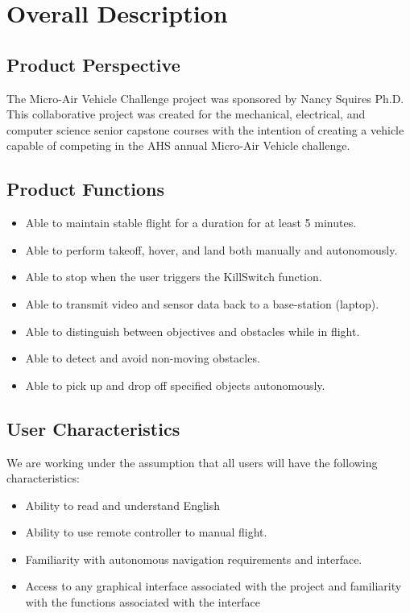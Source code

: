 \documentclass[onecolumn, draftclsnofoot,10pt, compsoc]{IEEEtran}
\begin{document}
\section{Overall Description}

\subsection{Product Perspective}
\indent The Micro-Air Vehicle Challenge project was sponsored by Nancy Squires Ph.D. This collaborative project was created for the mechanical, electrical, and computer science senior capstone courses with the intention of creating a vehicle capable of competing in the AHS annual Micro-Air Vehicle challenge. 

\subsection{Product Functions}
\begin{itemize} 

\item Able to maintain stable flight for a duration for at least 5 minutes.

\item Able to perform takeoff, hover, and land both manually and autonomously.

\item Able to stop when the user triggers the KillSwitch function.
 
\item Able to transmit video and sensor data back to a base-station (laptop).
 
\item Able to distinguish between objectives and obstacles while in flight. 

\item Able to detect and avoid non-moving obstacles.

\item Able to pick up and drop off specified objects autonomously.
\end{itemize}



\subsection{User Characteristics}

We are working under the assumption that all users will have the following characteristics:
\begin{itemize}
    \item Ability to read and understand English
    \item Ability to use remote controller to manual flight. 
    \item Familiarity with autonomous navigation requirements and interface.
    \item Access to any graphical interface associated with the project and familiarity with the functions associated with the interface
\end{itemize}
\end{document}

